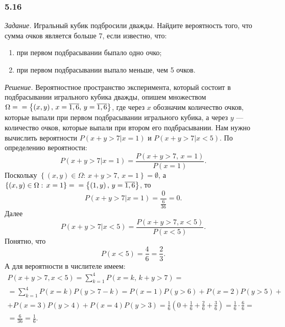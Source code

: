 \subsubsection*{5.16}

\textit{Задание.} Игральный кубик подбросили дважды.
Найдите вероятность того, что сумма очков является больше 7, если известно, что:

\begin{enumerate}[label=\alph*)]
\item при первом подбрасывании быпало одно очко;
\item при первом подбрасывании выпало меньше, чем 5 очков.
\end{enumerate}

\textit{Решение.}
Вероятностное пространство эксперимента,
который состоит в подбрасывании игрального кубика дважды,
опишем множеством
$ \Omega = \\
= \left\{ \left( x, y \right), \, x = \overline{1, 6}, \, y = \overline{1, 6} \right\} $,
где через $x$ обозначим количество очков,
которые выпали при первом подбрасывании игрального кубика, а через $y$ --- количество очков, которые выпали при втором его подбрасывании.
Нам нужно вычислить вероятности $P \left( \left. x+y>7 \right| x=1 \right) $ и $P \left( \left. x+y>7 \right| x<5 \right) $.
По определению вероятности:
$$P \left( \left. x+y>7 \right| x=1 \right) =
\frac{P \left( x+y>7, \, x=1 \right) }{P \left( x=1 \right) }.$$
Поскольку
$ \left\{ \left( x, y \right) \in \Omega: \, x + y > 7, \, x = 1 \right\} =
\emptyset $,
а $ \left\{ \left( x, y \right) \in \Omega: \, x = 1 \right\} =  \\ = \left\{ \left( 1, y \right), \, y = \overline{1, 6} \right\} $, то
$$P \left( \left. x+y>7 \right| x=1 \right) =
\frac{0}{ \frac{6}{36} } =
0.$$
Далее
$$P \left( \left. x+y>7 \right| x<5 \right) =
\frac{P \left( x+y>7, x<5 \right) }{P \left( x<5 \right) }.$$
Понятно, что
$$P \left( x<5 \right) =
\frac{4}{6} =
\frac{2}{3}.$$
А для вероятности в числителе имеем:
\begin{equation*}
\begin{split}
P \left( x+y>7, x<5 \right) =
\sum \limits_{k=1}^4 P \left(x=k, \, k+y>7 \right) = \\
= \sum \limits_{k=1}^4 P \left( x=k \right) P \left( y>7-k \right) =
P \left( x=1 \right) P \left( y>6 \right) +
P \left( x=2 \right) P \left( y>5 \right) + \\
+ P \left( x=3 \right) P \left( y>4 \right) +
P \left( x=4 \right) P \left( y>3 \right) =
\frac{1}{6} \left( 0 +\frac{1}{6} + \frac{2}{6} + \frac{3}{6} \right) =
\frac{1}{6} \cdot \frac{6}{6} = \\
= \frac{6}{36} =
\frac{1}{6}.
\end{split}
\end{equation*}

